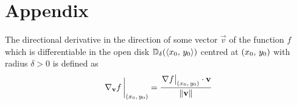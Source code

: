 \section{Appendix}
\begin{defn}
	The directional derivative in the direction of some vector $\vec{v}$ of the function $f$ which is differentiable in
	the open disk $\mathbb{D}_\delta(\langle x_0,\,y_0\rangle)$ centred at $\left(x_0,\,y_0\right)$ with radius $\delta>0$ is defined as
	$$
		\eval{\nabla_{\vec{v}}f\,}_{\point{x_0}{y_0}}=\frac{\eval{\nabla f}_{\point{x_0}{y_0}}\cdot\vec{v}}{\lVert\vec{v}\rVert}
	$$
	\cite{GIANNAKIDIS2010129}
\end{defn}